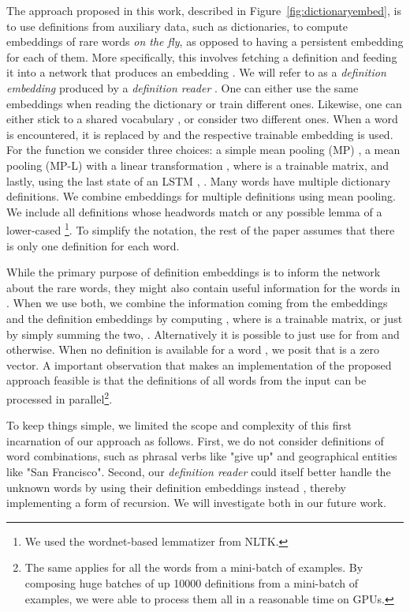 The approach proposed in this work, described in Figure~\ref{fig:dictionaryembed}, is to use definitions from auxiliary data, such as dictionaries, to compute embeddings of rare words \textit{on the fly}, as opposed to having a persistent embedding for each of them. More specifically, this involves fetching a definition  and feeding it into a network 
that produces an embedding . We will refer to  as a \textit{definition embedding} produced by a \textit{definition reader} . One can either use the same embeddings  when reading the dictionary or train different ones. Likewise, one can either stick to a shared vocabulary , or consider two different ones. When a word  is encountered, it is replaced by  and the respective trainable embedding  is used. For the function  we consider three choices: a simple mean pooling (MP) , a mean pooling (MP-L) with a linear transformation
, where  is a trainable matrix, and lastly, using the last state of an LSTM \citep{hochreiter97lstm}, . Many words have multiple dictionary definitions. We combine embeddings for multiple definitions using mean pooling. We include all definitions whose headwords match 
or any possible lemma of a lower-cased \footnote{We used the wordnet-based lemmatizer from NLTK.}. To simplify the notation, the rest of the paper assumes that there is only one definition for each word.

While the primary purpose of definition embeddings  is to inform the network about the rare words, they might
also contain useful information for the words in . When we use both, we combine the information coming from the embeddings  and the definition embeddings  by computing , where  is a trainable matrix, or just by simply summing the two, .
Alternatively it is possible to just use  for  from  and  otherwise. When no definition is available for a word , we posit that  is a zero vector. A important observation that makes an implementation of the proposed approach feasible is that the definitions  of all words  from the input can be processed in parallel\footnote{The same applies for all the words from a mini-batch of examples. By composing huge batches of up 10000 definitions from a mini-batch of examples, we were able to process them all in a reasonable time on GPUs.}.

To keep things simple, we limited the scope and complexity of this first incarnation of our approach as follows.
First, we do not consider definitions of word combinations, such as phrasal verbs like "give up" and geographical entities like "San Francisco". Second, our \emph{definition reader} could itself better handle the unknown words  by using their definition embeddings  instead , thereby implementing a form of recursion. We will investigate both in our future work.

